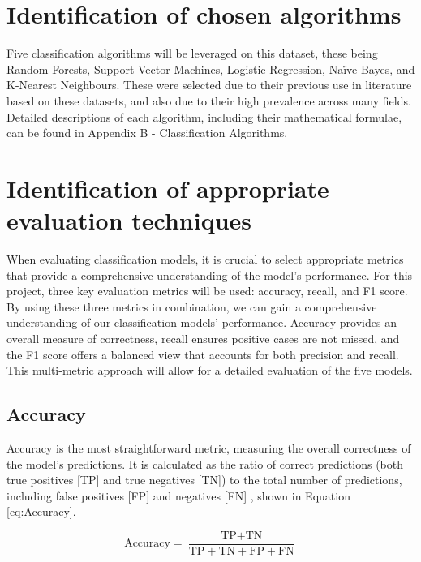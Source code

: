 \documentclass[12pt]{report}
\begin{document}
\section{Identification of chosen algorithms}\label{sec:ChosenAlgorithms}
Five classification algorithms will be leveraged on this dataset, these being Random Forests,
Support Vector Machines, Logistic Regression, Na\"ive Bayes, and K-Nearest Neighbours. These were 
selected due to their previous use in literature based on these datasets, and also due to their 
high prevalence across many fields. Detailed descriptions of each algorithm, including their 
mathematical formulae, can be found in Appendix B - Classification Algorithms.


\pagebreak
\section{Identification of appropriate evaluation techniques}
When evaluating classification models, it is crucial to select appropriate metrics that provide a comprehensive understanding of the model's performance.
For this project, three key evaluation metrics will be used: accuracy, recall, and F1 score. 
By using these three metrics in combination, we can gain a comprehensive understanding of our classification models' performance. Accuracy provides an overall measure of correctness,
recall ensures positive cases are not missed, and the F1 score offers a balanced view that accounts for both precision and recall.
This multi-metric approach will allow for a detailed evaluation of the five models.

\subsection{Accuracy}
Accuracy is the most straightforward metric, measuring the overall correctness of the model's predictions. It is calculated as the ratio of correct predictions
(both true positives [TP] and true negatives [TN]) to the total number of predictions, including false positives [FP] and negatives [FN] \autocite{google_classification_nodate},
shown in Equation \ref{eq:Accuracy}.

\begin{equation}\label{eq:Accuracy}
    \text{Accuracy} = \frac{\text{TP} + \text{TN}}{\text{TP} + \text{TN} + \text{FP} + \text{FN}}
\end{equation}
\end{document}
